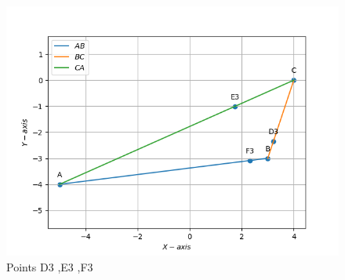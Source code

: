 \documentclass[10pt]{book}
\begin{document}
\begin{enumerate}[label=\thesection.\arabic*.,ref=\thesection.\theenumi]
\begin{figure}[H]
   \includegraphics{figs/D3E3F3.png}
    \caption{Points D3 ,E3 ,F3}
    \label{fig:Ang_bisect1}
\end{figure}


\end{enumerate}
\end{document}
